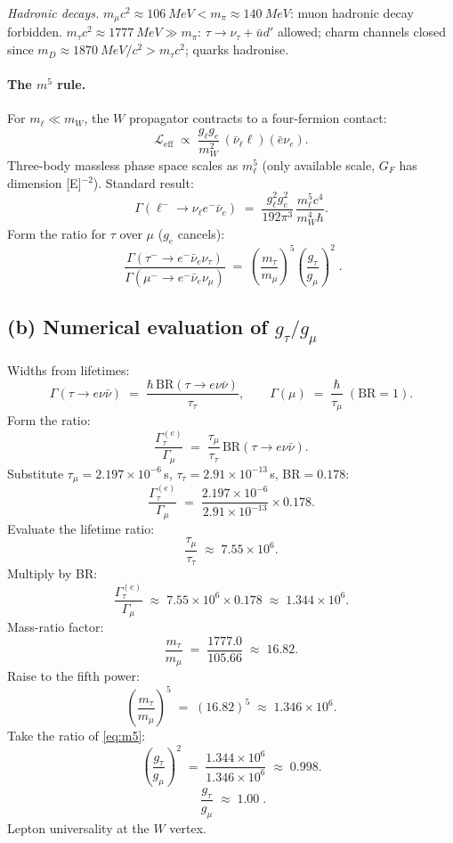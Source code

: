 \documentclass[11pt]{article}
\begin{document}
\emph{Hadronic decays.} $m_{\mu}c^{2}\approx\SI{106}{MeV}<m_{\pi}\approx\SI{140}{MeV}$: muon hadronic decay forbidden. $m_{\tau}c^{2}\approx\SI{1777}{MeV}\gg m_{\pi}$: $\tau\to\nu_{\tau}+\bar u d'$ allowed; charm channels closed since $m_{D}\approx\SI{1870}{MeV/c^{2}}>m_{\tau}c^{2}$; quarks hadronise.

\paragraph{The $m^{5}$ rule.} For $m_{\ell}\ll m_{W}$, the $W$ propagator contracts to a four-fermion contact:
\[
\mathcal{L}_\text{eff}\;\propto\;\frac{g_{\ell}g_{e}}{m_{W}^{2}}\,(\bar\nu_{\ell}\ell)(\bar e\nu_{e}).
\]
Three-body massless phase space scales as $m_{\ell}^{5}$ (only available scale, $G_{F}$ has dimension [E]$^{-2}$). Standard result:
\begin{equation}
\Gamma(\ell^{-}\to\nu_{\ell}e^{-}\bar\nu_{e})\;=\;\frac{g_{\ell}^{2}g_{e}^{2}}{192\pi^{3}}\,\frac{m_{\ell}^{5}c^{4}}{m_{W}^{4}\hbar}.
\label{eq:rate-leptonic}
\end{equation}
Form the ratio for $\tau$ over $\mu$ ($g_{e}$ cancels):
\begin{equation}
\boxed{\;\frac{\Gamma(\tau^{-}\to e^{-}\bar\nu_{e}\nu_{\tau})}{\Gamma(\mu^{-}\to e^{-}\bar\nu_{e}\nu_{\mu})}\;=\;\left(\frac{m_{\tau}}{m_{\mu}}\right)^{5}\!\left(\frac{g_{\tau}}{g_{\mu}}\right)^{2}\;.}
\label{eq:m5}
\end{equation}

\subsection*{(b) Numerical evaluation of $g_{\tau}/g_{\mu}$}

Widths from lifetimes:
\[
\Gamma(\tau\to e\nu\bar\nu)\;=\;\frac{\hbar\,\text{BR}(\tau\to e\nu\bar\nu)}{\tau_{\tau}},\qquad\Gamma(\mu)\;=\;\frac{\hbar}{\tau_{\mu}}\;(\text{BR}=1).
\]
Form the ratio:
\[
\frac{\Gamma_{\tau}^{(e)}}{\Gamma_{\mu}}\;=\;\frac{\tau_{\mu}}{\tau_{\tau}}\,\text{BR}(\tau\to e\nu\bar\nu).
\]
Substitute $\tau_{\mu}=2.197\times 10^{-6}\,$s, $\tau_{\tau}=2.91\times 10^{-13}\,$s, BR$=0.178$:
\[
\frac{\Gamma_{\tau}^{(e)}}{\Gamma_{\mu}}\;=\;\frac{2.197\times 10^{-6}}{2.91\times 10^{-13}}\times 0.178.
\]
Evaluate the lifetime ratio:
\[
\frac{\tau_{\mu}}{\tau_{\tau}}\;\approx\;7.55\times 10^{6}.
\]
Multiply by BR:
\[
\frac{\Gamma_{\tau}^{(e)}}{\Gamma_{\mu}}\;\approx\;7.55\times 10^{6}\times 0.178\;\approx\;1.344\times 10^{6}.
\]
Mass-ratio factor:
\[
\frac{m_{\tau}}{m_{\mu}}\;=\;\frac{1777.0}{105.66}\;\approx\;16.82.
\]
Raise to the fifth power:
\[
\left(\frac{m_{\tau}}{m_{\mu}}\right)^{5}\;=\;(16.82)^{5}\;\approx\;1.346\times 10^{6}.
\]
Take the ratio of \eqref{eq:m5}:
\[
\left(\frac{g_{\tau}}{g_{\mu}}\right)^{2}\;=\;\frac{1.344\times 10^{6}}{1.346\times 10^{6}}\;\approx\;0.998.
\]
\begin{equation}
\boxed{\;\frac{g_{\tau}}{g_{\mu}}\;\approx\;1.00\;.}
\label{eq:gtau-over-gmu}
\end{equation}
Lepton universality at the $W$ vertex.
\end{document}
